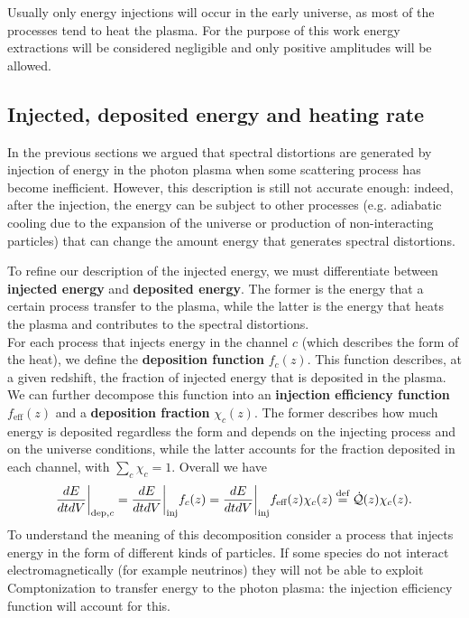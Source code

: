 Usually only energy injections will occur in the early universe, as most of the processes tend to heat the plasma. For the purpose of this work energy extractions will be considered negligible and only positive amplitudes will be allowed.  
\subsection{Injected, deposited energy and heating rate}\label{sec:SD_injected_deposited_energy}
In the previous sections we argued that spectral distortions are generated by injection of energy in the photon plasma when some scattering process has become inefficient. However, this description is still not accurate enough: indeed, after the injection, the energy can be subject to other processes (e.g. adiabatic cooling due to the expansion of the universe or production of non-interacting particles) that can change the amount energy that generates spectral distortions. 

To refine our description of the injected energy, we must differentiate between \textbf{injected energy} and \textbf{deposited energy}. The former is the energy that a certain process transfer to the plasma, while the latter is the energy that heats the plasma and contributes to the spectral distortions.\\ For each process that injects energy in the channel $c$ (which describes the form of the heat), we define the \textbf{deposition function} $f_c(z)$. This function describes, at a given redshift, the fraction of injected energy that is deposited in the plasma. We can further decompose this function into an \textbf{injection efficiency function } $f_{\text{eff}}(z)$ and a \textbf{deposition fraction} $\chi_{c}(z)$. The former describes how much energy is deposited regardless the form and depends on the injecting process and on the universe conditions, while the latter accounts for the fraction deposited in each channel, with $\sum_c\chi_c=1$. Overall we have
\begin{equation}\label{eq:deposition_function}
    \frac{dE}{dt dV}\bigg|_{\text{dep},c}=\frac{dE}{dt dV}\bigg|_{\text{inj}}f_c(z)=\frac{dE}{dt dV}\bigg|_{\text{inj}}f_{\text{eff}}(z)\chi_c(z)\stackrel{\text{def}}{=} \dot{\mathcal{Q}}(z)\chi_c(z).
\end{equation}
To understand the meaning of this decomposition consider a process that injects energy in the form of different kinds of particles. If some species do not interact electromagnetically (for example neutrinos) they will not be able to exploit Comptonization to transfer energy to the photon plasma: the injection efficiency function will account for this.


